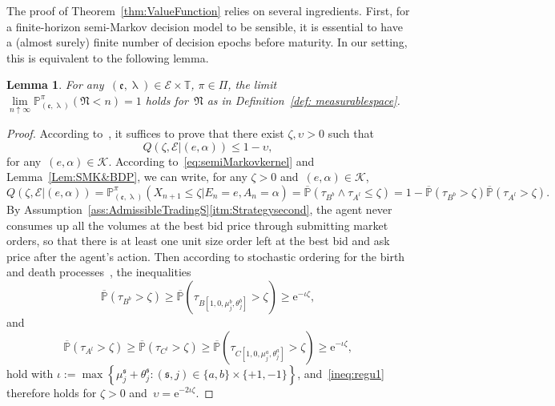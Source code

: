\documentclass{amsart}[11pt]
\numberwithin{equation}{section}
\newtheorem{lemma}[theorem]{Lemma}
\theoremstyle{definition}
\newcommand{\PP}{\mathbb{P}}
\newcommand{\Kk}{\mathcal{K}}
\newcommand{\Ee}{\mathcal{E}}
\newcommand{\E}{\mathrm{e}}
\newcommand{\Nn}{\mathfrak{N}}
\newcommand{\TT}{\mathbb{T}}
\newcommand{\ssf}{\mathfrak{s}}
\newcommand{\ee}{\mathfrak{e}}
\begin{document}
The proof of Theorem~\ref{thm:ValueFunction} relies on several ingredients.
First, for a finite-horizon semi-Markov decision model to be sensible,
it is essential to have a (almost surely) finite number of decision epochs before maturity. 
In our setting, this is equivalent to the following lemma.
\begin{lemma}\label{lem:fntde}
For any~$(\ee, \uplambda)\in \Ee\times\TT$, $\pi\in\Pi$, the limit
$\lim\limits_{n\uparrow \infty}\PP^\pi_{(\ee, \uplambda)}(\Nn < n) = 1$
holds for~$\Nn$ as in Definition~\ref{def: measurablespace}.
\end{lemma}
\begin{proof}
According to~\cite[Proposition 2.1]{huang2011finite}, 
it suffices to prove that there exist $\zeta, \upsilon>0$ such that
\begin{equation}\label{ineq:regu1}
{Q}(\zeta, \Ee\lvert ({e}, {\alpha})) \leq 1- \upsilon,
\end{equation}
for any~$({e}, {\alpha})\in \Kk$.
According to~\eqref{eq:semiMarkovkernel} and Lemma~\ref{Lem:SMK&BDP}, we can write,
for any $\zeta>0$ and~$({e}, {\alpha})\in \Kk$,
$$
{Q}(\zeta, \Ee\lvert({e}, {\alpha})) 
= \PP^\pi_{(\ee, {\uplambda})}(X_{n+1}\leq \zeta\lvert E_n = {e}, A_n = {\alpha})
 = \overline{\PP}\left(\tau_{{B}^b}\wedge\tau_{{A}^l}\leq \zeta\right)
= 1 - \overline{\PP}\left(\tau_{{B}^b} > \zeta\right) \overline{\PP}\left(\tau_{{A}^l} > \zeta\right).
$$
By Assumption~\ref{ass:AdmissibleTradingS}\eqref{itm:Strategysecond}, the agent never consumes up all the volumes at the best bid price through submitting market orders, 
so that there is at least one unit size order left at the best bid and ask price after the agent's action.
Then according to stochastic ordering for the birth and death processes~\cite[Section 3]{irle2003stochastic}, the inequalities
$$
\overline{\PP}\left(\tau_{{B}^b}> \zeta\right)
\geq
\overline{\PP}\left(\tau_{B[1, 0, \mu_{{j}}^b, \theta_{{j}}^b]} > \zeta\right) 
\geq \E^{-{\iota}\zeta},
$$
and
$$
\overline{\PP}\left(\tau_{{A}^l} > \zeta\right)
\geq
\overline{\PP}\left(\tau_{C^l} > \zeta\right)
\geq
\overline{\PP}\left(\tau_{C[1, 0, \mu_{{j}}^a, \theta_{{j}}^a]} > \zeta\right)
\geq \E^{-{\iota}\zeta},
$$
hold with
$\iota := \max\left\{\mu_j^\ssf+\theta_j^\ssf: (\ssf, j) \in \{a, b\}\times\{+1, -1\}\right\}$,
and~\eqref{ineq:regu1} therefore holds for $\zeta>0$ and~$\upsilon = \E^{-2{\iota}\zeta}$.
\end{proof}
\end{document}
